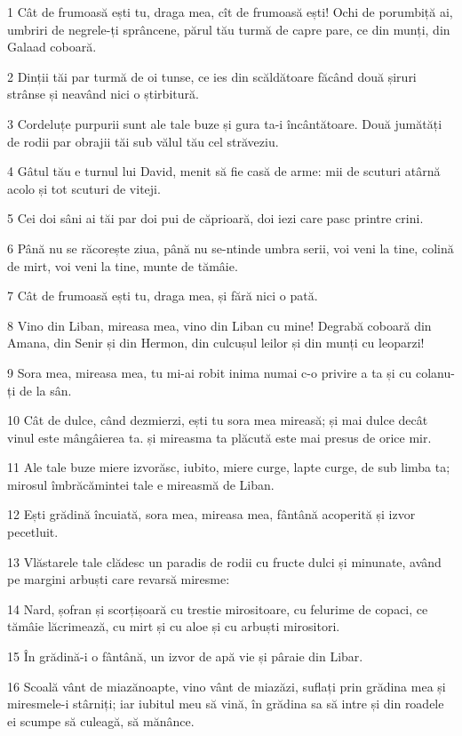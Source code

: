 \par 1 Cât de frumoasă ești tu, draga mea, cît de frumoasă ești! Ochi de porumbiță ai, umbriri de negrele-ți sprâncene, părul tău turmă de capre pare, ce din munți, din Galaad coboară.
\par 2 Dinții tăi par turmă de oi tunse, ce ies din scăldătoare făcând două șiruri strânse și neavând nici o știrbitură.
\par 3 Cordeluțe purpurii sunt ale tale buze și gura ta-i încântătoare. Două jumătăți de rodii par obrajii tăi sub vălul tău cel străveziu.
\par 4 Gâtul tău e turnul lui David, menit să fie casă de arme: mii de scuturi atârnă acolo și tot scuturi de viteji.
\par 5 Cei doi sâni ai tăi par doi pui de căprioară, doi iezi care pasc printre crini.
\par 6 Până nu se răcorește ziua, până nu se-ntinde umbra serii, voi veni la tine, colină de mirt, voi veni la tine, munte de tămâie.
\par 7 Cât de frumoasă ești tu, draga mea, și fără nici o pată.
\par 8 Vino din Liban, mireasa mea, vino din Liban cu mine! Degrabă coboară din Amana, din Senir și din Hermon, din culcușul leilor și din munți cu leoparzi!
\par 9 Sora mea, mireasa mea, tu mi-ai robit inima numai c-o privire a ta și cu colanu-ți de la sân.
\par 10 Cât de dulce, când dezmierzi, ești tu sora mea mireasă; și mai dulce decât vinul este mângâierea ta. și mireasma ta plăcută este mai presus de orice mir.
\par 11 Ale tale buze miere izvorăsc, iubito, miere curge, lapte curge, de sub limba ta; mirosul îmbrăcămintei tale e mireasmă de Liban.
\par 12 Ești grădină încuiată, sora mea, mireasa mea, fântână acoperită și izvor pecetluit.
\par 13 Vlăstarele tale clădesc un paradis de rodii cu fructe dulci și minunate, având pe margini arbuști care revarsă miresme:
\par 14 Nard, șofran și scorțișoară cu trestie mirositoare, cu felurime de copaci, ce tămâie lăcrimează, cu mirt și cu aloe și cu arbuști mirositori.
\par 15 În grădină-i o fântână, un izvor de apă vie și pâraie din Libar.
\par 16 Scoală vânt de miazănoapte, vino vânt de miazăzi, suflați prin grădina mea și miresmele-i stârniți; iar iubitul meu să vină, în grădina sa să intre și din roadele ei scumpe să culeagă, să mănânce.

